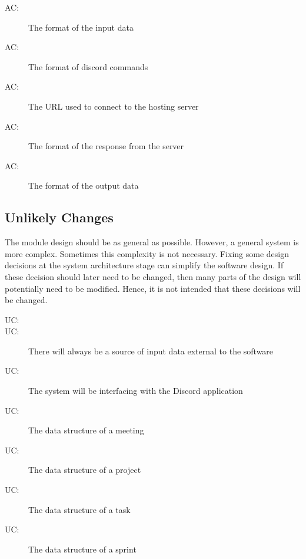 \documentclass[12pt, titlepage]{article}
\newcounter{acnum}
\newcommand{\actheacnum}{AC\theacnum}
\newcounter{ucnum}
\newcommand{\uctheucnum}{UC\theucnum}
\begin{document}
\begin{description}
\item[ \actheacnum \label{acInput1}:] The format of the input data
\item[ \actheacnum \label{acInput2}:] The format of discord commands
\item[ \actheacnum \label{acServer1}:] The URL used to connect to the hosting server
\item[ \actheacnum \label{acServer2}:] The format of the response from the server
\item[ \actheacnum \label{acOutput}:] The format of the output data
\end{description}

\subsection{Unlikely Changes} \label{SecUchange}

The module design should be as general as possible. However, a general system is
more complex. Sometimes this complexity is not necessary. Fixing some design
decisions at the system architecture stage can simplify the software design. If
these decision should later need to be changed, then many parts of the design
will potentially need to be modified. Hence, it is not intended that these
decisions will be changed.

\begin{description}
\item[ \uctheucnum \label{ucIO}:] 
\item[ \uctheucnum \label{ucInput}:] There will always be a source of input data external to the software
\item[ \uctheucnum \label{ucInput}:] The system will be interfacing with the Discord application
\item[ \uctheucnum \label{ucInput}:] The data structure of a meeting
\item[ \uctheucnum \label{ucInput}:] The data structure of a project
\item[ \uctheucnum \label{ucInput}:] The data structure of a task
\item[ \uctheucnum \label{ucInput}:] The data structure of a sprint
\end{description}
\end{document}
